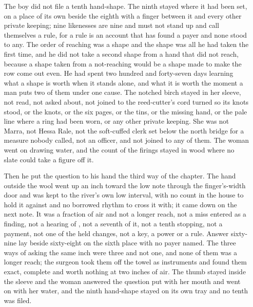 The boy did not file a tenth hand-shape. The ninth stayed where it had been set, on a place of its own beside the eighth with a finger between it and every other private keeping; nine likenesses are nine and must not stand up and call themselves a rule, for a rule is an account that has found a payer and none stood to any. The order of reaching was a shape and the shape was all he had taken the first time, and he did not take a second shape from a hand that did not reach, because a shape taken from a not-reaching would be a shape made to make the row come out even. He had spent two hundred and forty-seven days learning what a shape is worth when it stands alone, and what it is worth the moment a man puts two of them under one cause. The notched birch stayed in her sleeve, not read, not asked about, not joined to the reed-cutter's cord turned so its knots stood, or the knots, or the six pages, or the tins, or the missing hand, or the pale line where a ring had been worn, or any other private keeping. She was not Marra, not Hessa Rale, not the soft-cuffed clerk set below the north bridge for a measure nobody called, not an officer, and not joined to any of them. The woman went on drawing water, and the count of the firings stayed in wood where no slate could take a figure off it.

Then he put the question to his hand the third way of the chapter. The hand outside the wool went up an inch toward the low note through the finger's-width door and was kept to the river's own low interval, with no count in the house to hold it against and no borrowed rhythm to cross it with; it came down on the next note. It was a fraction of air and not a longer reach, not a miss entered as a finding, not a hearing of , not a seventh of it, not a tenth stopping, not a payment, not one of the held changes, not a key, a power or a rule. Answer sixty-nine lay beside sixty-eight on the sixth place with no payer named. The three ways of asking the same inch were three and not one, and none of them was a longer reach; the surgeon took them off the towel as instruments and found them exact, complete and worth nothing at two inches of air. The thumb stayed inside the sleeve and the woman answered the question put with her mouth and went on with her water, and the ninth hand-shape stayed on its own tray and no tenth was filed.
